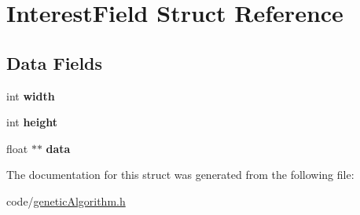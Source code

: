 \hypertarget{structInterestField}{}\section{Interest\+Field Struct Reference}
\label{structInterestField}
\subsection*{Data Fields}
\begin{DoxyCompactItemize}
\item 
int {\bfseries width}\hypertarget{structInterestField_a7606246e4d71680b926d0e0108feeea9}{}\label{structInterestField_a7606246e4d71680b926d0e0108feeea9}

\item 
int {\bfseries height}\hypertarget{structInterestField_a531c97fc090d4e5acfa2d4c56764215d}{}\label{structInterestField_a531c97fc090d4e5acfa2d4c56764215d}

\item 
float $\ast$$\ast$ {\bfseries data}\hypertarget{structInterestField_ae1b605c45b00dc7e1e6907750eb6e346}{}\label{structInterestField_ae1b605c45b00dc7e1e6907750eb6e346}

\end{DoxyCompactItemize}


The documentation for this struct was generated from the following file\+:\begin{DoxyCompactItemize}
\item 
code/\hyperlink{geneticAlgorithm_8h}{genetic\+Algorithm.\+h}\end{DoxyCompactItemize}
